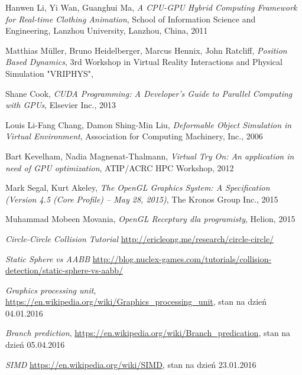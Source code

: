 \begin{thebibliography}{999}

 Hanwen Li, Yi Wan, Guanghui Ma, \emph{A CPU-GPU Hybrid Computing Framework for Real-time Clothing Animation}, School of Information Science and Engineering, Lanzhou University, Lanzhou, China, 2011

 Matthias Müller, Bruno Heidelberger, Marcus Hennix, John Ratcliff, \emph{Position Based Dynamics}, 3rd Workshop in Virtual Reality Interactions and Physical Simulation "VRIPHYS", 

 Shane Cook, \emph{CUDA Programming: A Developer's Guide to Parallel Computing with GPUs}, Elsevier Inc., 2013

 Louis Li-Fang Chang, Damon Shing-Min Liu, \emph{Deformable Object Simulation in Virtual Environment}, Association for Computing Machinery, Inc., 2006

 Bart Kevelham, Nadia Magnenat-Thalmann, \emph{Virtual Try On: An application in need of GPU optimization}, ATIP/A\*CRC HPC Workshop, 2012

 Mark Segal, Kurt Akeley, \emph{The OpenGL Graphics System: A Specification (Version 4.5 (Core Profile) -- May 28, 2015)}, The Kronos Group Inc., 2015

 Muhammad Mobeen Movania, \emph{OpenGL Receptury dla programisty}, Helion, 2015

 \emph{Circle-Circle Collision Tutorial} \href{http://ericleong.me/research/circle-circle/}{http://ericleong.me/research/circle-circle/}

 \emph{Static Sphere vs AABB} \href{http://blog.nuclex-games.com/tutorials/collision-detection/static-sphere-vs-aabb/}{http://blog.nuclex-games.com/tutorials/collision-detection/static\allowbreak-sphere-vs-aabb/}

 \emph{Graphics processing unit}, \href{https://en.wikipedia.org/wiki/Graphics\_processing\_unit}{https://en.wikipedia.org/wiki/Graphics\_processing\_unit}, stan na dzień 04.01.2016

 \emph{Branch prediction}, \href{https://en.wikipedia.org/wiki/Branch\_predication}{https://en.wikipedia.org/wiki/Branch\_predication}, stan na dzień 05.04.2016

 \emph{SIMD} \href{https://en.wikipedia.org/wiki/SIMD}{https://en.wikipedia.org/wiki/SIMD}, stan na dzień 23.01.2016


\end{thebibliography}
